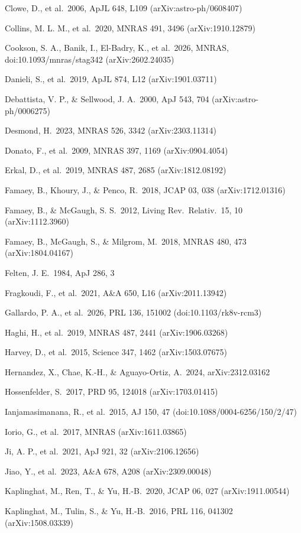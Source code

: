 \documentclass[
  10pt,
]{article}
\begin{document}
{\begin{list}{}{\setlength{\leftmargin}{1.5em}\setlength{\itemindent}{-1.5em}\setlength{\itemsep}{1pt}\setlength{\parsep}{0pt}}
\item Clowe, D., et al.\ 2006, ApJL 648, L109 (arXiv:astro-ph/0608407)
\item Collins, M. L. M., et al.\ 2020, MNRAS 491, 3496 (arXiv:1910.12879)
\item Cookson, S. A., Banik, I., El-Badry, K., et al.\ 2026, MNRAS, doi:10.1093/mnras/stag342 (arXiv:2602.24035)
\item Danieli, S., et al.\ 2019, ApJL 874, L12 (arXiv:1901.03711)
\item Debattista, V. P., \& Sellwood, J. A.\ 2000, ApJ 543, 704 (arXiv:astro-ph/0006275)
\item Desmond, H.\ 2023, MNRAS 526, 3342 (arXiv:2303.11314)
\item Donato, F., et al.\ 2009, MNRAS 397, 1169 (arXiv:0904.4054)
\item Erkal, D., et al.\ 2019, MNRAS 487, 2685 (arXiv:1812.08192)
\item Famaey, B., Khoury, J., \& Penco, R.\ 2018, JCAP 03, 038 (arXiv:1712.01316)
\item Famaey, B., \& McGaugh, S. S.\ 2012, Living Rev.\ Relativ.\ 15, 10 (arXiv:1112.3960)
\item Famaey, B., McGaugh, S., \& Milgrom, M.\ 2018, MNRAS 480, 473 (arXiv:1804.04167)
\item Felten, J. E.\ 1984, ApJ 286, 3
\item Fragkoudi, F., et al.\ 2021, A\&A 650, L16 (arXiv:2011.13942)
\item Gallardo, P. A., et al.\ 2026, PRL 136, 151002 (doi:10.1103/rk8v-rcm3)
\item Haghi, H., et al.\ 2019, MNRAS 487, 2441 (arXiv:1906.03268)
\item Harvey, D., et al.\ 2015, Science 347, 1462 (arXiv:1503.07675)
\item Hernandez, X., Chae, K.-H., \& Aguayo-Ortiz, A.\ 2024, arXiv:2312.03162
\item Hossenfelder, S.\ 2017, PRD 95, 124018 (arXiv:1703.01415)
\item Ianjamasimanana, R., et al.\ 2015, AJ 150, 47 (doi:10.1088/0004-6256/150/2/47)
\item Iorio, G., et al.\ 2017, MNRAS (arXiv:1611.03865)
\item Ji, A. P., et al.\ 2021, ApJ 921, 32 (arXiv:2106.12656)
\item Jiao, Y., et al.\ 2023, A\&A 678, A208 (arXiv:2309.00048)
\item Kaplinghat, M., Ren, T., \& Yu, H.-B.\ 2020, JCAP 06, 027 (arXiv:1911.00544)
\item Kaplinghat, M., Tulin, S., \& Yu, H.-B.\ 2016, PRL 116, 041302 (arXiv:1508.03339)

\end{list}}
\end{document}
